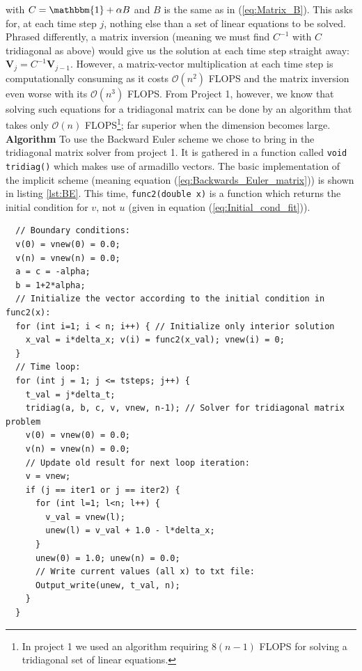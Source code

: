 \documentclass[a4paper, 11pt, notitlepage,english]{article}
\newcommand{\id}{\mathbbm{1}}
\begin{document}
with $C = \id + \alpha B$ and $B$ is the same as in (\ref{eq:Matrix_B}). This asks for, at each time step $j$, nothing else than a set of linear equations to be solved. Phrased differently, a matrix inversion (meaning we must find $C^{-1}$ with $C$ tridiagonal as above) would give us the solution at each time step straight away: $\boldsymbol{V}_j = C^{-1} \boldsymbol{V}_{j-1}$. However, a matrix-vector multiplication at each time step is computationally consuming as it costs $\mathcal{O}(n^2)$ FLOPS and the matrix inversion even worse with its $\mathcal{O}(n^3)$ FLOPS. From Project 1, however, we know that solving such equations for a tridiagonal matrix can be done by an algorithm that takes only $\mathcal{O}(n)$ FLOPS\footnote{In project 1 we used an algorithm requiring $8(n-1)$ FLOPS for solving a tridiagonal set of linear equations.}; far superior when the dimension becomes large. \\

\textbf{Algorithm} \newline
To use the Backward Euler scheme we chose to bring in the tridiagonal matrix solver from project 1. It is gathered in a function called \texttt{void tridiag()} which makes use of armadillo vectors. The basic implementation of the implicit scheme (meaning equation (\ref{eq:Backwards_Euler_matrix})) is shown in listing \ref{lst:BE}. This time, \texttt{func2(double x)} is a function which returns the initial condition for $v$, not $u$ (given in equation (\ref{eq:Initial_cond_fit})).

\begin{center}
\begin{lstlisting}
  // Boundary conditions:
  v(0) = vnew(0) = 0.0;
  v(n) = vnew(n) = 0.0;
  a = c = -alpha; 
  b = 1+2*alpha; 
  // Initialize the vector according to the initial condition in func2(x):
  for (int i=1; i < n; i++) { // Initialize only interior solution
    x_val = i*delta_x; v(i) = func2(x_val); vnew(i) = 0;
  }
  // Time loop:
  for (int j = 1; j <= tsteps; j++) {
    t_val = j*delta_t;
    tridiag(a, b, c, v, vnew, n-1); // Solver for tridiagonal matrix problem
    v(0) = vnew(0) = 0.0;
    v(n) = vnew(n) = 0.0;
    // Update old result for next loop iteration:
    v = vnew;
    if (j == iter1 or j == iter2) {
      for (int l=1; l<n; l++) {
        v_val = vnew(l);
        unew(l) = v_val + 1.0 - l*delta_x;
      }
      unew(0) = 1.0; unew(n) = 0.0;
      // Write current values (all x) to txt file:
      Output_write(unew, t_val, n);
    }
  }
\end{lstlisting}
\end{center}
\end{document}
